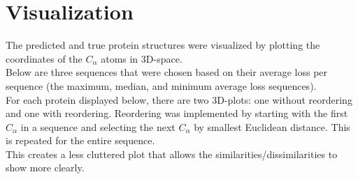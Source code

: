 \documentclass[11pt]{article}
\newcommand{\np}{\newpage}
\begin{document}
\section{Visualization}
The predicted and true protein structures were visualized by plotting the coordinates of the $C_{\alpha}$ atoms in 3D-space.\\[2mm]
Below are three sequences that were chosen based on their average loss per sequence (the maximum, median, and minimum average loss sequences).\\[2mm]
For each protein displayed below, there are two 3D-plots: one without reordering and one with reordering.  Reordering was implemented by starting with the first $C_{\alpha}$ in a sequence and selecting the next $C_{\alpha}$ by smallest Euclidean distance.  This is repeated for the entire sequence.\\
This creates a less cluttered plot that allows the similarities/dissimilarities to show more clearly.
\np
\end{document}
